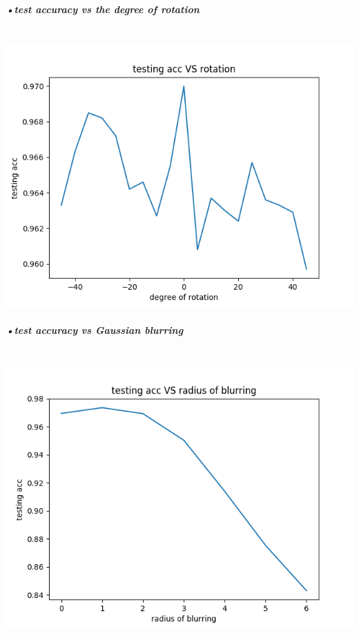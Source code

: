 \documentclass[11pt]{article} %
\begin{document}
\subparagraph{•test accuracy vs the degree of rotation}\mbox{}\\
\includegraphics[scale=0.7]{e142rotation.png}

\subparagraph{•test accuracy vs Gaussian blurring}\mbox{}\\
\includegraphics[scale=0.7]{e142blur.png}
\end{document}
